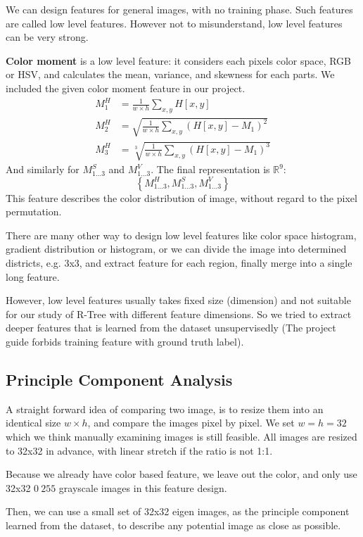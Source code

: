 \documentclass{acm_proc_article-sp}
\begin{document}
We can design features for general images, with no training phase. Such
features are called low level features. However not to misunderstand, low level
features can be very strong.

\textbf{Color moment} is a low level feature: it considers each pixels color
space, RGB or HSV, and calculates the mean, variance, and skewness for each parts.
We included the given color moment feature in our project.
\begin{align}
        M^H_1&=\frac{1}{w\times h}\sum_{x,y}H[x,y]\\
        M^H_2&=\sqrt{\frac{1}{w\times h}\sum_{x,y}(H[x,y]-M_1)^2}\\
        M^H_3&=\sqrt[3]{\frac{1}{w\times h}\sum_{x,y}(H[x,y]-M_1)^3}
\end{align}
And similarly for $M^S_{1\dots 3}$ and $M^V_{1\dots 3}$. The final
representation is $\mathbb{R}^9$:\[\left\{M^H_{1\dots 3}, M^S_{1\dots 3},
M^V_{1\dots 3}\right\}\]
This feature describes the color distribution of image, without regard to the
pixel permutation.

There are many other way to design low level features like color space histogram,
gradient distribution or histogram, or we can divide the image into determined
districts, e.g. 3x3, and extract feature for each region, finally merge into a
single long feature.

However, low level features usually takes fixed size (dimension) and not
suitable for our study of R-Tree with different feature dimensions. So we tried
to extract deeper features that is learned from the dataset unsupervisedly (The
project guide forbids training feature with ground truth label).

\subsection{Principle Component Analysis}
A straight forward idea of comparing two image, is to resize them into an
identical size $w\times h$, and compare the images pixel by pixel. We set
$w=h=32$ which we think manually examining images is still feasible. All images
are resized to 32x32 in advance, with linear stretch if the ratio is not 1:1.

Because we already have color based feature, we leave out the color, and only use 32x32 $0~255$
grayscale images in this feature design.

Then, we can use a small set of 32x32 eigen images, as the principle
component learned from the dataset, to describe any potential image as close as
possible.
\end{document}
